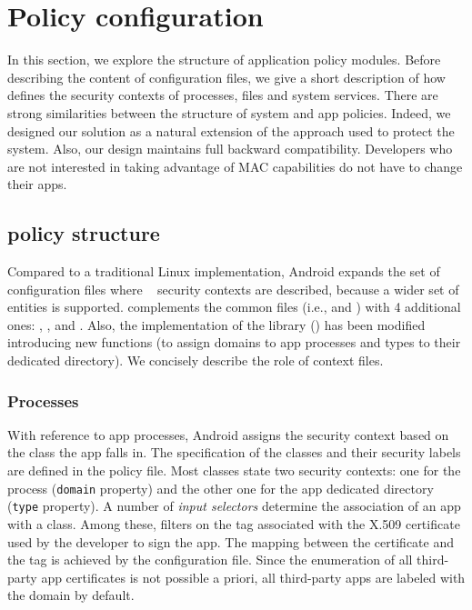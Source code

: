 \section{Policy configuration}\label{sect:seapp_config}

In this section, we explore the structure of application policy
modules.  Before describing the content of \seapp configuration files,
we give a short description of how \sea defines the security contexts
of processes, files and system services.  There are strong
similarities between the structure of system and app policies.
Indeed, we designed our solution as a natural extension of the
approach used to protect the system.  Also, our design maintains full
backward compatibility.  Developers who are not interested in taking
advantage of MAC capabilities do not have to change their apps.


\subsection{\sea policy structure}\label{sect:seapp_seandroid}

Compared to a traditional Linux implementation, Android expands the
set of configuration files where \sel~\cite{seapp_sea_files} security
contexts are described, because a wider set of entities is supported.
\sea complements the common \sel files (i.e., \filecontexts and
\genfscontexts) with 4 additional ones: \propertycontexts,
\servicecontexts, \seappcontexts and \macpermissions.  Also, the
implementation of the \sel library (\libselinux)
\cite{seapp_libselinux} has been modified introducing new functions
(to assign domains to app processes and types to their dedicated
directory).  We concisely describe the role of \sea context files.

\subsubsection{Processes}

With reference to app processes, Android assigns the security context
based on the class the app falls in.  The specification of the classes
and their security labels are defined in the \seappcontexts policy
file.  Most classes state two security contexts: one for the process
({\tt domain} property) and the other one for the app dedicated
directory ({\tt type} property).  A number of {\em input selectors}
determine the association of an app with a class.  Among these,
\seinfo filters on the tag associated with the X.509 certificate used
by the developer to sign the app.  The mapping between the certificate
and the \seinfo tag is achieved by the \macpermissions configuration
file.  Since the enumeration of all third-party app certificates is
not possible a priori, all third-party apps are labeled with the
\untrustedapp domain by default.


